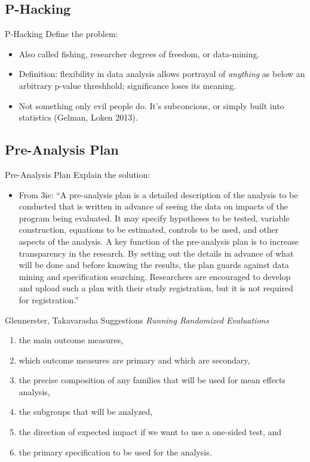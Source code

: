 \documentclass{beamer}
\begin{document}
\subsection*{P-Hacking}
\begin{frame}[<.->]{P-Hacking}
Define the problem:
\begin{itemize}
\item
Also called fishing, researcher degrees of freedom, or data-mining.
\item
Definition: flexibility in data analysis allows portrayal of \textit{anything} as below an arbitrary p-value threshhold; significance loses its meaning.
\item
Not something only evil people do. It's subconcious, or simply built into statistics (Gelman, Loken 2013).
\end{itemize}
\end{frame}

\subsection*{Pre-Analysis Plan}
\begin{frame}{Pre-Analysis Plan}
Explain the solution:
\begin{itemize}
\item
From 3ie: ``A pre-analysis plan is a detailed description of the analysis to be conducted that is written in advance of seeing the data on impacts of the program being evaluated. It may specify hypotheses to be tested, variable construction, equations to be estimated, controls to be used, and other aspects of the analysis. A key function of the pre-analysis plan is to increase transparency in the research. By setting out the details in advance of what will be done and before knowing the results, the plan guards against data mining and specification searching. Researchers are encouraged to develop and upload such a plan with their study registration, but it is not required for registration.''
\end{itemize}
\end{frame}

\begin{frame}{Glennerster, Takavarasha Suggestions}
\textit{Running Randomized Evaluations}
\begin{enumerate}[<.->]
\def\labelenumi{\arabic{enumi}.}
\item
  the main outcome measures,
\item
  which outcome measures are primary and which are secondary,
\item
  the precise composition of any families that will be used for mean
  effects analysis,
\item
  the subgroups that will be analyzed,
\item
  the direction of expected impact if we want to use a one-sided test,
  and
\item
  the primary specification to be used for the analysis.
\end{enumerate}
\end{frame}
\end{document}

